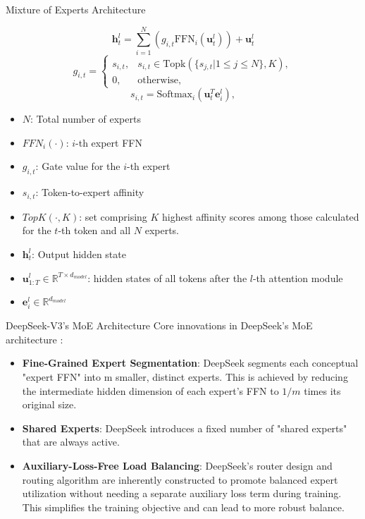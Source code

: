 \documentclass{beamer}
\begin{document}
\begin{frame}[allowframebreaks]{Mixture of Experts Architecture}

  $$ \mathbf{h}^l_t = \sum_{i=1}^{N} \left(g_{i,t} \text{FFN}_i (\mathbf{u}^l_t)\right) + \mathbf{u}^l_t $$
  $$ g_{i,t} = \begin{cases} s_{i,t}, & s_{i,t} \in \text{Topk}(\{s_{j,t}|1 \le j \le N\}, K), \\ 0, & \text{otherwise}, \end{cases} $$
  $$ s_{i,t} = \text{Softmax}_i \left(\mathbf{u}_t^T \mathbf{e}_i^l\right), $$
  

  \begin{itemize}
    \item $N$: Total number of experts
    \item $FFN_i(\cdot)$: $i$-th expert FFN
    \item $g_{i,t}$: Gate value for the $i$-th expert
    \item $s_{i,t}$: Token-to-expert affinity
    \item $TopK(\cdot, K)$: set
    comprising $K$ highest affinity scores among those calculated for 
    the $t$-th token and all $N$ experts.
    \item $\mathbf{h}^l_t$: Output hidden state
    \item $\mathbf{u}^l_{1:T} \in \mathbb{R}^{T \times d_{model}}$: hidden states of all tokens after
    the $l$-th attention module
    \item $\mathbf{e}_i^l \in \mathbb{R}^{d_{model}}$ 
  \end{itemize}
  \cite{dai2024deepseekmoe}
\end{frame}




\begin{frame}{DeepSeek-V3's MoE Architecture}
  Core innovations in DeepSeek's MoE architecture \cite{dai2024deepseekmoe}:
  \begin{itemize}
    \item \textbf{Fine-Grained Expert Segmentation}: DeepSeek segments each conceptual "expert FFN" into m smaller, distinct experts. 
    This is achieved by reducing the intermediate hidden dimension of each expert's FFN to $1/m$ times its original size.
    \item \textbf{Shared Experts}: DeepSeek introduces a fixed number of "shared experts" that are always active.
    \item \textbf{Auxiliary-Loss-Free Load Balancing}: DeepSeek's router design and routing algorithm are inherently constructed to promote balanced expert 
    utilization without needing a separate auxiliary loss term during training. This simplifies the training objective and can lead to more robust balance.
  \end{itemize}
\end{frame}
\end{document}
